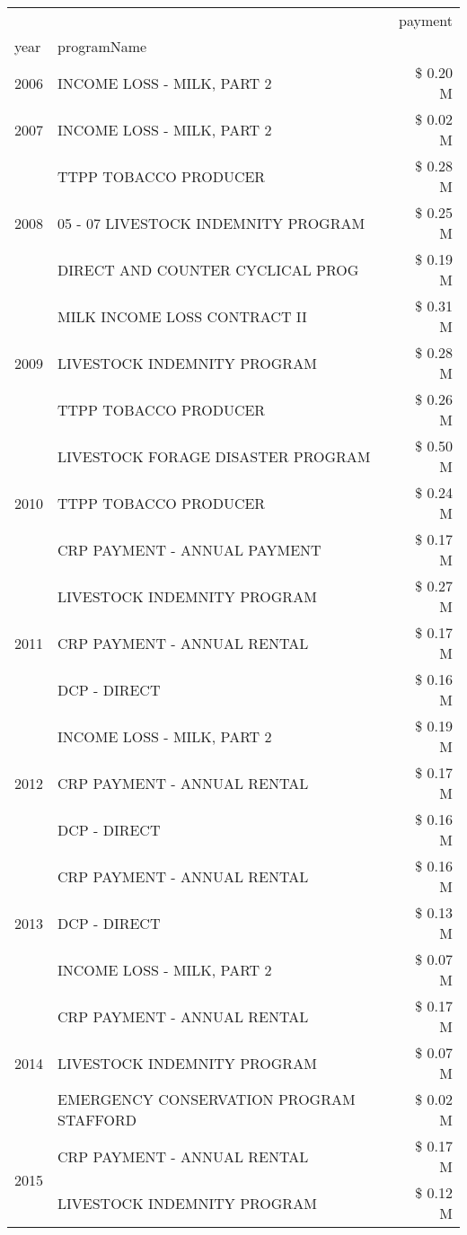\begin{tabular}{llr}
\toprule
 &  & payment \\
year & programName &  \\
\midrule
2006 & INCOME LOSS - MILK, PART 2 & \$ 0.20 M \\
\cline{1-3}
2007 & INCOME LOSS - MILK, PART 2 & \$ 0.02 M \\
\cline{1-3}
\multirow[t]{3}{*}{2008} & TTPP TOBACCO PRODUCER & \$ 0.28 M \\
 & 05 - 07 LIVESTOCK INDEMNITY PROGRAM & \$ 0.25 M \\
 & DIRECT AND COUNTER CYCLICAL PROG & \$ 0.19 M \\
\cline{1-3}
\multirow[t]{3}{*}{2009} & MILK INCOME LOSS CONTRACT II & \$ 0.31 M \\
 & LIVESTOCK INDEMNITY PROGRAM & \$ 0.28 M \\
 & TTPP TOBACCO PRODUCER & \$ 0.26 M \\
\cline{1-3}
\multirow[t]{3}{*}{2010} & LIVESTOCK FORAGE DISASTER  PROGRAM & \$ 0.50 M \\
 & TTPP TOBACCO PRODUCER & \$ 0.24 M \\
 & CRP PAYMENT - ANNUAL PAYMENT & \$ 0.17 M \\
\cline{1-3}
\multirow[t]{3}{*}{2011} & LIVESTOCK INDEMNITY PROGRAM & \$ 0.27 M \\
 & CRP PAYMENT - ANNUAL RENTAL & \$ 0.17 M \\
 & DCP - DIRECT & \$ 0.16 M \\
\cline{1-3}
\multirow[t]{3}{*}{2012} & INCOME LOSS - MILK, PART 2 & \$ 0.19 M \\
 & CRP PAYMENT - ANNUAL RENTAL & \$ 0.17 M \\
 & DCP - DIRECT & \$ 0.16 M \\
\cline{1-3}
\multirow[t]{3}{*}{2013} & CRP PAYMENT - ANNUAL RENTAL & \$ 0.16 M \\
 & DCP - DIRECT & \$ 0.13 M \\
 & INCOME LOSS - MILK, PART 2 & \$ 0.07 M \\
\cline{1-3}
\multirow[t]{3}{*}{2014} & CRP PAYMENT - ANNUAL RENTAL & \$ 0.17 M \\
 & LIVESTOCK INDEMNITY PROGRAM & \$ 0.07 M \\
 & EMERGENCY CONSERVATION PROGRAM STAFFORD & \$ 0.02 M \\
\cline{1-3}
\multirow[t]{3}{*}{2015} & CRP PAYMENT - ANNUAL RENTAL & \$ 0.17 M \\
 & LIVESTOCK INDEMNITY PROGRAM & \$ 0.12 M \\

\end{tabular}
